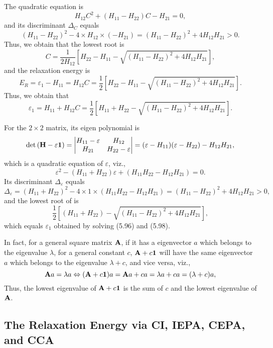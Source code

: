 \documentclass[a4paper]{book}
\newcounter{solution}[chapter]
\renewcommand\det[1]{{\rm det}\left(#1\right)}
\newcommand{\A}{{\bf A}}
\newcommand{\HH}{{\bf H}}
\newcommand{\I}{{\bf 1}}
\begin{document}
	\begin{solution}
	The quadratic equation is	
	\[
		H_{12} C^2 + ( H_{11} - H_{22} ) C - H_{21} = 0,
	\]	
	and its discriminant $\Delta_C$ equals
	\[
		( H_{11} - H_{22} )^2 - 4 \times H_{12} \times ( -H_{21} ) = ( H_{11} - H_{22} )^2 + 4 H_{12} H_{21} > 0.
	\]
	Thus, we obtain that the lowest root is
	\[
		C = \frac{1}{ 2H_{12} } \left[ H_{22} - H_{11} - \sqrt{ ( H_{11} - H_{22} )^2 + 4 H_{12} H_{21} } \right],
	\]
	and the relaxation energy is
	\[
		E_R = \varepsilon_1 - H_{11} = H_{12} C = \frac{1}{ 2 } \left[ H_{22} - H_{11} - \sqrt{ ( H_{11} - H_{22} )^2 + 4 H_{12} H_{21} } \right] .
	\]
	Thus, we obtain that
	\[
		\varepsilon_1 = H_{11} + H_{12} C = \frac{1}{ 2 } \left[ H_{11} + H_{22} - \sqrt{ ( H_{11} - H_{22} )^2 + 4 H_{12} H_{21} } \right] .
	\]
	
	For the $2 \times 2$ matrix, its eigen polynomial is
	\[
		\det{ \HH - \varepsilon \I } = \begin{vmatrix}
			H_{11} - \varepsilon & H_{12} \\ H_{21} & H_{22} - \varepsilon
		\end{vmatrix} = ( \varepsilon - H_{11} ) ( \varepsilon - H_{22} ) - H_{12} H_{21},
	\]
	which is a quadratic equation of $\varepsilon$, viz.,
	\[
		\varepsilon^2 - ( H_{11} + H_{22} ) \varepsilon + ( H_{11} H_{22} - H_{12} H_{21} ) = 0.
	\]
	Its discriminant $\Delta_\varepsilon$ equals
	\[
		\Delta_\varepsilon = ( H_{11} + H_{22} )^2 - 4 \times 1 \times ( H_{11} H_{22} - H_{12} H_{21} ) = ( H_{11} - H_{22} )^2 + 4 H_{12} H_{21} > 0,
	\]
	and the lowest root of is
	\[
		\frac{1}{2} \left[ ( H_{11} + H_{22} ) - \sqrt{ ( H_{11} - H_{22} )^2 + 4 H_{12} H_{21} } \right],
	\]
	which equals $\varepsilon_1$ obtained by solving (5.96) and (5.98).	
	
	In fact, for a general square matrix $\A$, if it has a eigenvector $a$ which belongs to the eigenvalue $\lambda$, for a general constant $c$, $\A+c\I$ will have the same eigenvector $a$ which belongs to the eigenvalue $\lambda + c$, and vice versa, viz.,
	\[
		\A a = \lambda a \Leftrightarrow (\A + c \I) a = \A a + c a = \lambda a + c a = (\lambda + c) a,
	\]
	Thus, the lowest eigenvalue of $\A+c\I$ is the sum of $c$ and the lowest eigenvalue of $\A$.
	
	\end{solution}
	
	\subsection{The Relaxation Energy via CI, IEPA, CEPA, and CCA}
	
\end{document}

